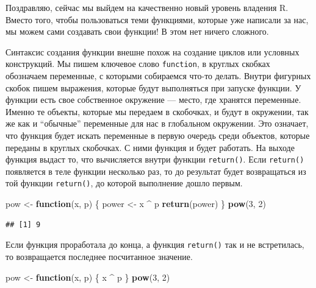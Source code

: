 \documentclass[]{book}
\newenvironment{Shaded}{\begin{snugshade}}{\end{snugshade}}
\newcommand{\KeywordTok}[1]{\textcolor[rgb]{0.13,0.29,0.53}{\textbf{#1}}}
\newcommand{\DecValTok}[1]{\textcolor[rgb]{0.00,0.00,0.81}{#1}}
\newcommand{\StringTok}[1]{\textcolor[rgb]{0.31,0.60,0.02}{#1}}
\newcommand{\ControlFlowTok}[1]{\textcolor[rgb]{0.13,0.29,0.53}{\textbf{#1}}}
\newcommand{\OperatorTok}[1]{\textcolor[rgb]{0.81,0.36,0.00}{\textbf{#1}}}
\newcommand{\NormalTok}[1]{#1}
\begin{document}
Поздравляю, сейчас мы выйдем на качественно новый уровень владения R.
Вместо того, чтобы пользоваться теми функциями, которые уже написали за
нас, мы можем сами создавать свои функции! В этом нет ничего сложного.

Синтаксис создания функции внешне похож на создание циклов или условных
конструкций. Мы пишем ключевое слово \texttt{function}, в круглых
скобках обозначаем переменные, с которыми собираемся что-то делать.
Внутри фигурных скобок пишем выражения, которые будут выполняться при
запуске функции. У функции есть свое собственное окружение --- место,
где хранятся переменные. Именно те объекты, которые мы передаем в
скобочках, и будут в окружении, так же как и ``обычные'' переменные для
нас в глобальном окружении. Это означает, что функция будет искать
переменные в первую очередь среди объектов, которые переданы в круглых
скобочках. С ними функция и будет работать. На выходе функция выдаст то,
что вычисляется внутри функции \texttt{return()}. Если \texttt{return()}
появляется в теле функции несколько раз, то до результат будет
возвращаться из той функции \texttt{return()}, до которой выполнение
дошло первым.

\begin{Shaded}
\begin{Highlighting}[]
\NormalTok{pow <-}\StringTok{ }\ControlFlowTok{function}\NormalTok{(x, p) \{}
\NormalTok{  power <-}\StringTok{ }\NormalTok{x }\OperatorTok{^}\StringTok{ }\NormalTok{p}
  \KeywordTok{return}\NormalTok{(power)}
\NormalTok{\}}
\KeywordTok{pow}\NormalTok{(}\DecValTok{3}\NormalTok{, }\DecValTok{2}\NormalTok{)}
\end{Highlighting}
\end{Shaded}

\begin{verbatim}
## [1] 9
\end{verbatim}

Если функция проработала до конца, а функция \texttt{return()} так и не
встретилась, то возвращается последнее посчитанное значение.

\begin{Shaded}
\begin{Highlighting}[]
\NormalTok{pow <-}\StringTok{ }\ControlFlowTok{function}\NormalTok{(x, p) \{}
\NormalTok{  x }\OperatorTok{^}\StringTok{ }\NormalTok{p}
\NormalTok{\}}
\KeywordTok{pow}\NormalTok{(}\DecValTok{3}\NormalTok{, }\DecValTok{2}\NormalTok{)}
\end{Highlighting}
\end{Shaded}
\end{document}
